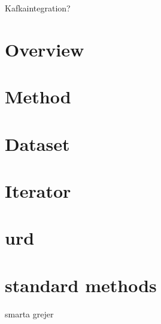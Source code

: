 \documentclass[a4paper]{report}
\begin{document}
Kafkaintegration?

%

\chapter{Overview}



\chapter{Method}


\chapter{Dataset}



\chapter{Iterator}


\chapter{urd}



\chapter{standard methods}


%
%




%


%


smarta grejer



\end{document}

